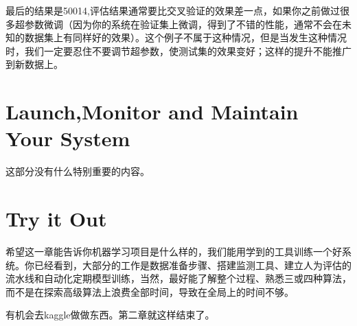 \documentclass[UTF8]{ctexart}
\begin{document}
最后的结果是50014,评估结果通常要比交叉验证的效果差一点，如果你之前做过很多超参数微调（因为你的系统在验证集上微调，得到了不错的性能，通常不会在未知的数据集上有同样好的效果）。这个例子不属于这种情况，但是当发生这种情况时，我们一定要忍住不要调节超参数，使测试集的效果变好；这样的提升不能推广到新数据上。

\section{Launch,Monitor and Maintain Your System}

这部分没有什么特别重要的内容。


\section{Try it Out}

希望这一章能告诉你机器学习项目是什么样的，我们能用学到的工具训练一个好系统。你已经看到，大部分的工作是数据准备步骤、搭建监测工具、建立人为评估的流水线和自动化定期模型训练，当然，最好能了解整个过程、熟悉三或四种算法，而不是在探索高级算法上浪费全部时间，导致在全局上的时间不够。

有机会去kaggle做做东西。第二章就这样结束了。
\end{document}
